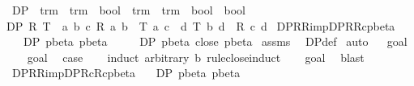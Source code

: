 \begin{isabellebody}
\isamarkuptrue%
\isamarkupfalse%
\ DP\ {\isacharcolon}{\isacharcolon}\ {\isachardoublequoteopen}{\isacharparenleft}trm\ {\isasymRightarrow}\ trm\ {\isasymRightarrow}\ bool{\isacharparenright}\ {\isasymRightarrow}\ {\isacharparenleft}trm\ {\isasymRightarrow}\ trm\ {\isasymRightarrow}\ bool{\isacharparenright}\ {\isasymRightarrow}\ bool{\isachardoublequoteclose}\ \isanewline
{\isachardoublequoteopen}DP\ R\ T\ {\isacharequal}\ {\isacharparenleft}{\isasymforall}a\ b\ c{\isachardot}\ R\ a\ b\ {\isasymand}\ T\ a\ c\ {\isasymlongrightarrow}\ {\isacharparenleft}{\isasymexists}d{\isachardot}\ T\ b\ d\ {\isasymand}\ R\ c\ d{\isacharparenright}{\isacharparenright}{\isachardoublequoteclose}\isanewline
\isanewline
{}\isamarkupfalse%
\ DP{\isacharunderscore}R{\isacharunderscore}R{\isacharunderscore}imp{\isacharunderscore}DP{\isacharunderscore}R{\isacharunderscore}Rc{\isacharunderscore}pbeta{\isacharcolon}\isanewline
\ \ \ {\isachardoublequoteopen}DP\ pbeta\ pbeta{\isachardoublequoteclose}\isanewline
\ \ \ \ \ {\isachardoublequoteopen}DP\ pbeta\ {\isacharparenleft}close\ pbeta{\isacharparenright}{\isachardoublequoteclose}\isanewline
%
\isadelimproof
%
\endisadelimproof
%
\isatagproof
{}\isamarkupfalse%
\ assms\ \isamarkupfalse%
\ DP{\isacharunderscore}def\isanewline
{}\isamarkupfalse%
\ auto\isanewline
{}\isamarkupfalse%
\ {\isacharminus}\isanewline
{}\isamarkupfalse%
\ goal{}\ \isanewline
\ \ \isamarkupfalse%
\ goal{}{\isacharparenleft}{}{\isacharcomma}{}{\isacharparenright}\ \isamarkupfalse%
\ {\isacharquery}case\isanewline
\ \ \isamarkupfalse%
\ {\isacharparenleft}induct\ arbitrary{\isacharcolon}\ b\ rule{\isacharcolon}close{\isachardot}induct{\isacharparenright}\isanewline
\ \ \isamarkupfalse%
\ goal{}{\isacharparenleft}{}{\isacharparenright}\ \isamarkupfalse%
\ blast{\isacharplus}\isanewline
{}\isamarkupfalse%
%
\endisatagproof
{\isafoldproof}%
%
\isadelimproof
\isanewline
%
\endisadelimproof
\isanewline
{}\isamarkupfalse%
\ DP{\isacharunderscore}R{\isacharunderscore}R{\isacharunderscore}imp{\isacharunderscore}DP{\isacharunderscore}Rc{\isacharunderscore}Rc{\isacharunderscore}pbeta{\isacharcolon}\isanewline
\ \ \ {\isachardoublequoteopen}DP\ pbeta\ pbeta{\isachardoublequoteclose}\isanewline

\end{isabellebody}
